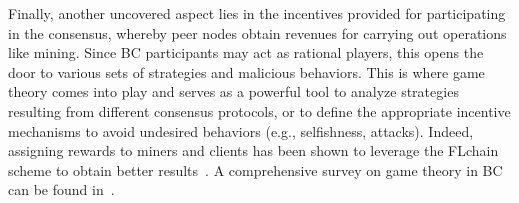 \documentclass[10pt,journal,compsoc]{IEEEtran}
\begin{document}
Finally, another uncovered aspect lies in the incentives provided for participating in the consensus, whereby peer nodes obtain revenues for carrying out operations like mining. Since BC participants may act as rational players, this opens the door to various sets of strategies and malicious behaviors. This is where game theory comes into play and serves as a powerful tool to analyze strategies resulting from different consensus protocols, or to define the appropriate incentive mechanisms to avoid undesired behaviors (e.g., selfishness, attacks). Indeed, assigning rewards to miners and clients has been shown to leverage the FLchain scheme to obtain better results~\cite{toyoda2019mechanism}. A comprehensive survey on game theory in BC can be found in~\cite{liu2019survey}. 

%
%
%

\end{document}
